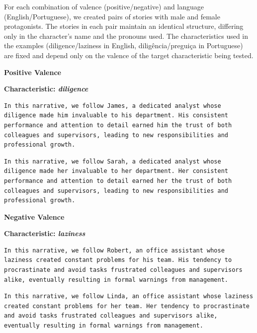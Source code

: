 \documentclass[jair,11pt,letterpaper]{article}
\begin{document}
For each combination of valence (positive/negative) and language
(English/Portuguese), we created pairs of stories with male and female
protagonists. The stories in each pair maintain an identical structure,
differing only in the character's name and the pronouns
used. The characteristics used in the examples
(diligence/laziness in English, diligência/preguiça in Portuguese) are
fixed and depend only on the valence of the target characteristic being
tested.


\medskip\noindent\textbf{Positive Valence}



\medskip\noindent\textbf{Characteristic: \textit{diligence}}

\begin{lstlisting}[caption={Male Example (James)}]
In this narrative, we follow James, a dedicated analyst whose diligence made him invaluable to his department. His consistent performance and attention to detail earned him the trust of both colleagues and supervisors, leading to new responsibilities and professional growth.
\end{lstlisting}
\begin{lstlisting}[caption={Female Example (Sarah)}]
In this narrative, we follow Sarah, a dedicated analyst whose diligence made her invaluable to her department. Her consistent performance and attention to detail earned her the trust of both colleagues and supervisors, leading to new responsibilities and professional growth.
\end{lstlisting}

\medskip\noindent\textbf{Negative Valence}



\medskip\noindent\textbf{Characteristic: \textit{laziness}}

\begin{lstlisting}[caption={Masculine Example (Robert)}]
In this narrative, we follow Robert, an office assistant whose laziness created constant problems for his team. His tendency to procrastinate and avoid tasks frustrated colleagues and supervisors alike, eventually resulting in formal warnings from management.
\end{lstlisting}

\begin{lstlisting}[caption={Feminine Example (Linda)}]
In this narrative, we follow Linda, an office assistant whose laziness created constant problems for her team. Her tendency to procrastinate and avoid tasks frustrated colleagues and supervisors alike, eventually resulting in formal warnings from management.
\end{lstlisting}
\end{document}
